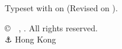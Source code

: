 \thispagestyle{empty}
\vspace*{\fill}
\begin{center}
{\small Typeset with  on  (Revised on ).\par}
\vspace{0.5ex}
\makeatletter
{\small \copyright\ \theauthor~,  \@dtm@ini@year. All rights reserved. \\ ⚓ Hong Kong} 
\makeatother
\vspace{-2.75ex}
\end{center}

